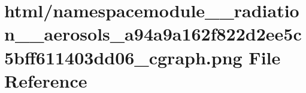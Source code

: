 \hypertarget{namespacemodule____radiation____aerosols__a94a9a162f822d2ee5c5bff611403dd06__cgraph_8png}{}\section{html/namespacemodule\+\_\+\+\_\+radiation\+\_\+\+\_\+aerosols\+\_\+a94a9a162f822d2ee5c5bff611403dd06\+\_\+cgraph.png File Reference}
\label{namespacemodule____radiation____aerosols__a94a9a162f822d2ee5c5bff611403dd06__cgraph_8png}
